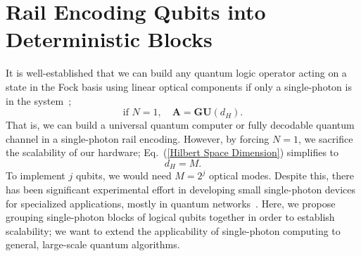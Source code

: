 \documentclass[aps,pra,twocolumn,showpacs,superscriptaddress,floatfix,10pt]{revtex4}
\begin{document}
\section{Rail Encoding Qubits into Deterministic Blocks}
\label{Section Block Encoding}
It is well-established that we can build any quantum logic operator acting on a state in the Fock basis using linear optical components if only a single-photon is in the system~\cite{Adami,Torma,Pittman};
\begin{equation}
\label{Isomorphism}
	\mbox{if } N=1, \quad \textbf{A} = \textbf{GU}(d_H).
\end{equation}
That is, we can build a universal quantum computer or fully decodable quantum channel in a single-photon rail encoding. However, by forcing $N=1$, we sacrifice the scalability of our hardware; Eq.~(\ref{Hilbert Space Dimension}) simplifies to
\begin{equation}
d_H = M.
\end{equation}
To implement $j$ qubits, we would need $M=2^j$ optical modes. Despite this, there has been significant experimental effort in developing small single-photon devices for specialized applications, mostly in quantum networks~\cite{Starek,Barreiro,Graham,Lanyon}. Here, we propose grouping single-photon blocks of logical qubits together in order to establish scalability; we want to extend the applicability of single-photon computing to general, large-scale quantum algorithms. 
\end{document}
